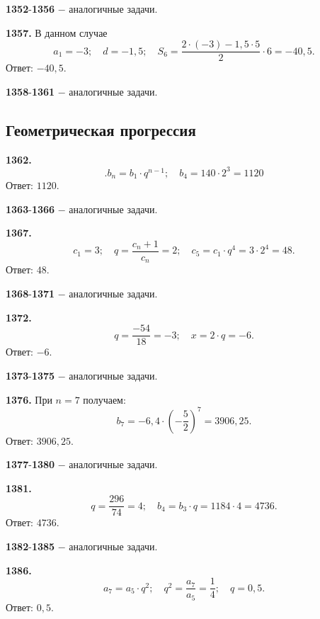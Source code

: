 \textbf{1352}-\textbf{1356} $-$ аналогичные задачи.

\textbf{1357.} В данном случае $$a_1=-3;\quad d=-1,5;\quad S_6=\frac{2\cdot(-3)-1,5\cdot5}{2}\cdot6=-40,5.$$ \newline \null \hspace*{\fill} Ответ: $-40,5$.

\textbf{1358}-\textbf{1361} $-$ аналогичные задачи.

\subsection{Геометрическая прогрессия}


\textbf{1362.} $$.b_n=b_1\cdot q^{n-1};\quad b_4=140\cdot2^3=1120$$ \newline \null \hspace*{\fill} Ответ: $1120$.

\textbf{1363}-\textbf{1366} $-$ аналогичные задачи.

\textbf{1367.} $$c_1=3;\quad q=\frac{c_n+1}{c_n}=2;\quad c_5=c_1\cdot q^4=3\cdot2^4=48.$$ \newline \null \hspace*{\fill} Ответ: $48$. 

\textbf{1368}-\textbf{1371} $-$ аналогичные задачи.   

\textbf{1372.} $$q=\frac{-54}{18}=-3;\quad x=2\cdot q=-6.$$ \newline \null \hspace*{\fill} Ответ: $-6$.

\textbf{1373}-\textbf{1375} $-$ аналогичные задачи.

\textbf{1376.} При $n=7$ получаем: $$b_7=-6,4\cdot\left(-\frac{5}{2}\right)^7=3906,25.$$ \newline \null \hspace*{\fill} Ответ: $3906,25$.

\textbf{1377}-\textbf{1380} $-$ аналогичные задачи.

\textbf{1381.} $$q=\frac{296}{74}=4;\quad b_4=b_3\cdot q=1184\cdot4=4736.$$ \newline \null \hspace*{\fill} Ответ: $4736$.

\textbf{1382}-\textbf{1385} $-$ аналогичные задачи.

\textbf{1386.} $$a_7=a_5\cdot q^2;\quad q^2=\frac{a_7}{a_5}=\frac{1}{4};\quad q=0,5.$$ \newline \null \hspace*{\fill} Ответ: $0,5$.

